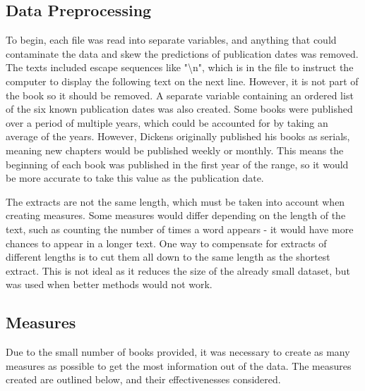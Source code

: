 \documentclass[11pt,a4paper,reqno]{amsart}
\begin{document}
\subsection{Data Preprocessing}
To begin, each file was read into separate variables, and anything that could contaminate the data and skew the predictions of publication dates was removed. The texts included escape sequences like "\textbackslash n", which is in the file to instruct the computer to display the following text on the next line. However, it is not part of the book so it should be removed. A separate variable containing an ordered list of the six known publication dates was also created. Some books were published over a period of multiple years, which could be accounted for by taking an average of the years. However, Dickens originally published his books as serials, meaning new chapters would be published weekly or monthly. This means the beginning of each book was published in the first year of the range, so it would be more accurate to take this value as the publication date.

The extracts are not the same length, which must be taken into account when creating measures. Some measures would differ depending on the length of the text, such as counting the number of times a word appears - it would have more chances to appear in a longer text. One way to compensate for extracts of different lengths is to cut them all down to the same length as the shortest extract. This is not ideal as it reduces the size of the already small dataset, but was used when better methods would not work.


\subsection{Measures}
Due to the small number of books provided, it was necessary to create as many measures as possible to get the most information out of the data. The measures created are outlined below, and their effectivenesses considered. 

\end{document}

